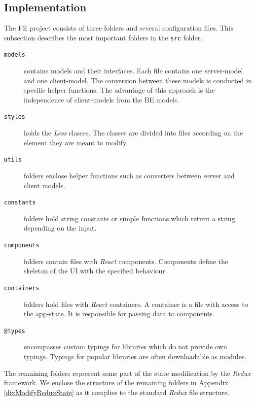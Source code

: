 \subsection{Implementation} \label{FEImplementation}
The FE project consists of three folders and several configuration files. This subsection describes the most important folders in the \texttt{src} folder. 
\begin{description}
    \item[\texttt{models}] contains models and their interfaces. Each file contains one server-model and one client-model. The conversion between these models is conducted in specific helper functions. The advantage of this approach is the independence of client-models from the BE models.
    \item[\texttt{styles}] holds the \textit{Less} classes. The classes are divided into files according on the element they are meant to modify.
    \item[\texttt{utils}] folders enclose helper functions such as converters between server and client models.
    \item[\texttt{constants}] folders hold string constants or simple functions which return a string depending on the input. 
    \item[\texttt{components}] folders contain files with \textit{React} components. Components define the skeleton of the UI with the specified behaviour.
    \item[\texttt{containers}] folders hold files with \textit{React} containers. A container is a file with access to the app-state. It is responsible for passing data to components. 
    \item[\texttt{@types}] encompasses custom typings for libraries which do not provide own typings. Typings for popular libraries are often downloadable as modules.
\end{description}
The remaining folders represent some part of the state modification by the \textit{Redux} framework. We enclose the structure of the remaining folders in Appendix \ref{dixModifyReduxState} as it complies to the standard \textit{Redux} file structure.
